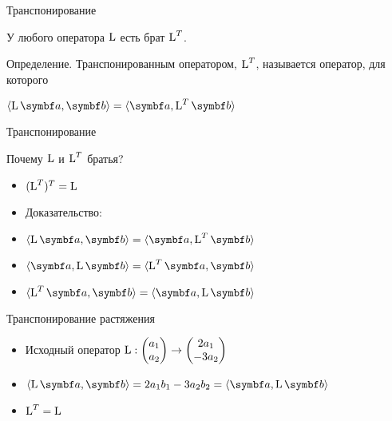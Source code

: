 

\begin{frame} %


\end{frame}

\begin{frame}{Транспонирование}

У любого оператора $\operatorname{L}$ есть брат $\operatorname{L}^T$.

Определение. \alert{Транспонированным оператором}, $\operatorname{L}^T$, называется оператор, для которого

$\langle \LL \ba, \bb\rangle = \langle \ba, \LL^T \bb\rangle$
    

\end{frame}



\begin{frame}{Транспонирование}


Почему $\operatorname{L}$ и $\operatorname{L}^T$ братья? 

\begin{itemize}[<+->]
    \item $(\operatorname{L}^T)^T = \operatorname{L}$
    \item Доказательство:
    
    \item $\langle \LL \ba , \bb \rangle = \langle  \ba , \LL^T \bb \rangle$  
    
    \item $\langle \ba , \LL \bb \rangle = \langle \LL^T \ba,  \bb \rangle$  

    \item $\langle \LL^T \ba,  \bb \rangle = \langle \ba , \LL \bb \rangle $  

\end{itemize}


\end{frame}




\begin{frame}{Транспонирование растяжения}


\begin{itemize}[<+->]
    \item 
Исходный оператор $\operatorname{L} : \begin{pmatrix}
  a_1 \\
  a_2 \\
\end{pmatrix} \to
\begin{pmatrix}
  2a_1 \\
  -3a_2 \\
\end{pmatrix}
$

\item 
$\langle \LL \ba , \bb \rangle = 2a_1 b_1 - 3a_2 b_2 = \langle  \ba , \LL \bb \rangle$

\item $\operatorname{L}^T = \operatorname{L}$

\end{itemize}

\end{frame}




